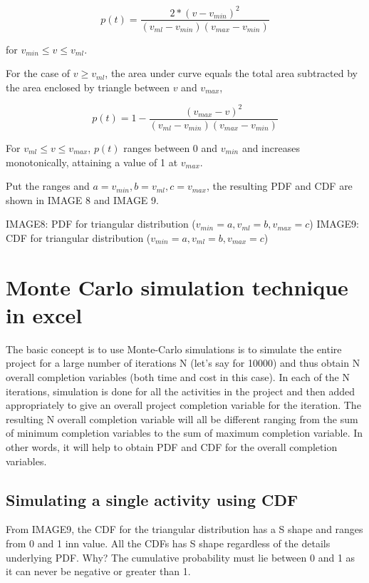 \begin{equation}
p(t)  = \frac{2* (v - v_{min})^{2}}{ (v_{ml} - v_{min}) (v_{max} - v_{min}) } 
\label{eqn8}
\end{equation}

for $ v_{min} \leqslant v \leqslant v_{ml}$.

For the case of $ v \geqslant v_{ml}$, the area under curve equals the total area subtracted by the area enclosed by triangle between $v$ and $v_{max}$,

\begin{equation}
p(t)  = 1 -  \frac{(v_{max} - v)^{2}}{ (v_{ml} - v_{min}) (v_{max} - v_{min}) } 
\label{eqn9}
\end{equation}

For $ v_{ml} \leqslant v \leqslant v_{max}$, $p(t)$ ranges between 0 and $v_{min}$ and increases monotonically, attaining a value of 1 at $v_{max}$. 

Put the ranges and $ a = v_{min}, b = v_{ml}, c = v_{max}$, the resulting PDF and CDF are shown in IMAGE 8 and IMAGE 9.

IMAGE8: PDF for triangular distribution ($v_{min} = a,  v_{ml} = b , v_{max} =c$)
IMAGE9: CDF for triangular distribution ($v_{min} = a,  v_{ml} = b , v_{max} =c$)

\section{Monte Carlo simulation technique in excel}

The basic concept is to use Monte-Carlo simulations is to simulate the entire project for a large number of iterations N (let’s say for 10000) and thus obtain N overall completion variables (both time and cost in this case). In each of the N iterations, simulation is done for all the activities in the project and then added appropriately to give an overall project completion variable for the iteration. The resulting N overall completion variable will all be different ranging from the sum of minimum completion variables to the sum of maximum completion variable. In other words, it will help to obtain PDF and CDF for the overall completion variables.


\subsection{Simulating a single activity using CDF}
From IMAGE9, the CDF for the triangular distribution has a S shape and ranges from 0 and 1 inn value. All the CDFs has S shape regardless of the details underlying PDF.
Why?
The cumulative probability must lie between 0 and 1 as it can never be negative or greater than 1.

